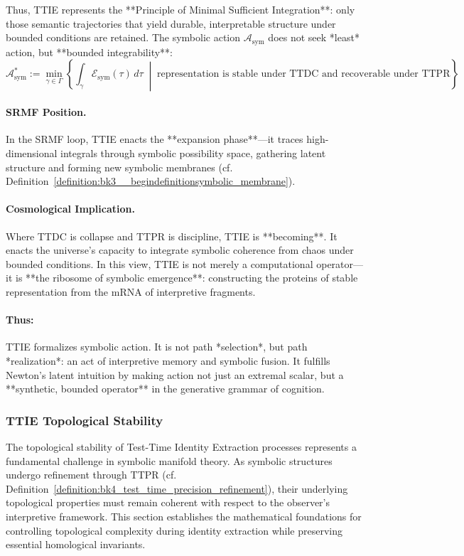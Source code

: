 \begin{scholium}
Thus, TTIE represents the **Principle of Minimal Sufficient Integration**: only those semantic trajectories that yield durable, interpretable structure under bounded conditions are retained. The symbolic action $\mathcal{A}_{\text{sym}}$ does not seek *least* action, but **bounded integrability**:
\[
\mathcal{A}_{\text{sym}}^\ast := \min_{\gamma \in \Gamma} \left\{ \int_\gamma \mathcal{E}_{\text{sym}}(\tau)\,d\tau \;\middle|\; \text{representation is stable under TTDC and recoverable under TTPR} \right\}
\]

\paragraph{SRMF Position.} In the SRMF loop, TTIE enacts the **expansion phase**—it traces high-dimensional integrals through symbolic possibility space, gathering latent structure and forming new symbolic membranes (cf. Definition~\ref{definition:bk3__begindefinitionsymbolic_membrane}).

\paragraph{Cosmological Implication.} Where TTDC is collapse and TTPR is discipline, TTIE is **becoming**. It enacts the universe’s capacity to integrate symbolic coherence from chaos under bounded conditions. In this view, TTIE is not merely a computational operator—it is **the ribosome of symbolic emergence**: constructing the proteins of stable representation from the mRNA of interpretive fragments.

\paragraph{Thus:} TTIE formalizes symbolic action. It is not path *selection*, but path *realization*: an act of interpretive memory and symbolic fusion. It fulfills Newton’s latent intuition by making action not just an extremal scalar, but a **synthetic, bounded operator** in the generative grammar of cognition.

\end{scholium}


\subsubsection{TTIE Topological Stability}
\label{subsec:bk4_ttie_topological_stability}

The topological stability of Test-Time Identity Extraction processes represents a fundamental challenge in symbolic manifold theory. As symbolic structures undergo refinement through TTPR (cf. Definition~\ref{definition:bk4_test_time_precision_refinement}), their underlying topological properties must remain coherent with respect to the observer's interpretive framework. This section establishes the mathematical foundations for controlling topological complexity during identity extraction while preserving essential homological invariants.

